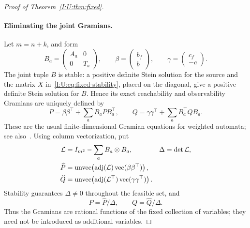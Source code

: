 \begin{proof}[Proof of Theorem~\ref{I:U:thm:fixed}]
\paragraph{Eliminating the joint Gramians.}
Let $m=n+k$, and form
\[
 B_a=\begin{pmatrix}A_a&0\\0&T_a\end{pmatrix},\qquad
 \beta=\begin{pmatrix}b_f\\b\end{pmatrix},\qquad
 \gamma=\begin{pmatrix}c_f\\-c\end{pmatrix}.
\]
The joint tuple $B$ is stable: a positive definite Stein solution for
the source and the matrix $X$ in~\eqref{I:U:eq:fixed-stability}, placed on
the diagonal, give a positive definite Stein solution for $B$.
Hence its exact reachability and observability Gramians are uniquely
defined by
\[
 P=\beta\beta^\top+\sum_aB_aPB_a^\top,\qquad
 Q=\gamma\gamma^\top+\sum_aB_a^\top QB_a.
\]
These are the usual finite-dimensional Gramian equations for weighted
automata; see also~\cite{sva2019}.
Using column vectorization, put
\begin{align}
 \mathcal L&=I_{m^2}-\sum_a B_a\otimes B_a,
 &\Delta&=\det\mathcal L,\label{I:U:eq:fixed-L}\\
 \widehat P
 &=\operatorname{unvec}\!\left(
       \operatorname{adj}(\mathcal L)\operatorname{vec}(\beta\beta^\top)
     \right),&&\nonumber\\
 \widehat Q
 &=\operatorname{unvec}\!\left(
       \operatorname{adj}(\mathcal L^\top)\operatorname{vec}(\gamma\gamma^\top)
     \right).&&
 \label{I:U:eq:fixed-adj}
\end{align}
Stability guarantees $\Delta\ne0$ throughout the feasible set, and
\begin{equation}\label{I:U:eq:fixed-rational-grams}
 P=\widehat P/\Delta,\qquad Q=\widehat Q/\Delta.
\end{equation}
Thus the Gramians are rational functions of the fixed collection of
variables; they need not be introduced as additional variables.


\end{proof}
